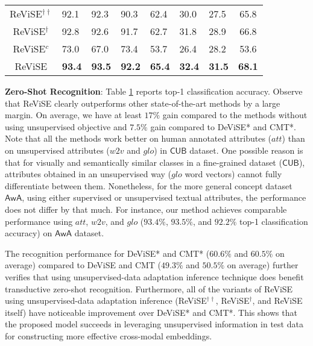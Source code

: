 {{\begin{table}[t!]
{\begin{tabular}{|c||lll||lll||c|}
ReViSE$^{\dagger\dagger}$             &            92.1              &             92.3            &         90.3      &       62.4          &       30.0            &         27.5       &           65.8                 \\
ReViSE$^{\dagger}$ &              92.8            &              92.6           &           91.7               &     62.7           &      31.8             &      28.9          &       66.8                     \\
ReViSE$^{c}$             &            73.0              &             67.0            &         73.4      &       53.7          &       26.4            &         28.2       &           53.6                \\
ReViSE                &           {\bf 93.4}               &           {\bf 93.5}      &            {\bf 92.2}       &         {\bf 65.4}         & {\bf 32.4}        &           {\bf 31.5}        &      {\bf 68.1}                 \\ \hline
\end{tabular}
}
\label{tbl:zero_recog}
\vspace{-4mm}
\end{table}



\vspace{0.1in}
\hspace{-5mm} {\bf Zero-Shot Recognition}:
Table \ref{tbl:zero_recog} reports top-1 classification accuracy. Observe that ReViSE clearly outperforms other state-of-the-art methods by a large margin. On average, we have at least $17\%$ gain compared to the methods without using unsupervised objective and $7.5\%$ gain compared to DeViSE* and CMT*. Note that all the methods work better on human annotated attributes ($\textit{att}$) than on unsupervised attributes ($\textit{w2v}$ and $\textit{glo}$) in $\mathsf{CUB}$ dataset. One possible reason is that for visually and semantically similar classes in a fine-grained dataset ($\mathsf{CUB}$), attributes obtained in an unsupervised way ($\textit{glo}$ word vectors) cannot fully differentiate between them. 
Nonetheless, for the more general concept dataset $\mathsf{AwA}$, using either supervised or unsupervised textual attributes, the performance does not differ by that much. 
For instance, our method achieves comparable performance using $\textit{att}$, $\textit{w2v}$, and $\textit{glo}$ ($93.4\%$, $93.5\%$, and $92.2\%$ top-1 classification accuracy) on $\mathsf{AwA}$ dataset.


The recognition performance for DeViSE* and CMT* ($60.6\%$ and $60.5\%$ on average) compared to DeViSE and CMT ($49.3\%$ and $50.5\%$ on average) further verifies that using unsupervised-data adaptation inference technique does benefit transductive zero-shot recognition. 
Furthermore, all of the variants of ReViSE using unsupervised-data adaptation inference (ReViSE$^{\dagger\dagger}$, ReViSE$^\dagger$, and ReViSE itself) have noticeable improvement over DeViSE* and CMT*. 
This shows that the proposed model succeeds in leveraging unsupervised information in test data for constructing more effective cross-modal embeddings.

}}
